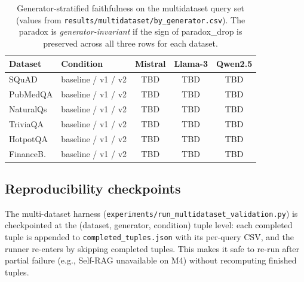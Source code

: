 \begin{table}[!htbp]
\centering
\caption{Generator-stratified faithfulness on the multidataset query set
(values from \texttt{results/multidataset/by\_generator.csv}). The
paradox is \emph{generator-invariant} if the sign of paradox\_drop is
preserved across all three rows for each dataset.}
\label{tab:by_generator}
\small
\begin{tabular}{llccc}
\toprule
Dataset & Condition & Mistral & Llama-3 & Qwen2.5 \\
\midrule
SQuAD     & baseline / v1 / v2 & TBD & TBD & TBD \\
PubMedQA  & baseline / v1 / v2 & TBD & TBD & TBD \\
NaturalQs & baseline / v1 / v2 & TBD & TBD & TBD \\
TriviaQA  & baseline / v1 / v2 & TBD & TBD & TBD \\
HotpotQA  & baseline / v1 / v2 & TBD & TBD & TBD \\
FinanceB. & baseline / v1 / v2 & TBD & TBD & TBD \\
\bottomrule
\end{tabular}
\end{table}

\subsection{Reproducibility checkpoints}

The multi-dataset harness (\texttt{experiments/run\_multidataset\_validation.py})
is checkpointed at the (dataset, generator, condition) tuple level: each
completed tuple is appended to \texttt{completed\_tuples.json} with its
per-query CSV, and the runner re-enters by skipping completed tuples.
This makes it safe to re-run after partial failure (e.g., Self-RAG
unavailable on M4) without recomputing finished tuples.
